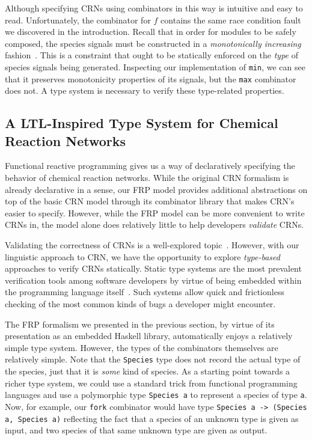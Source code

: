 Although specifying CRNs using combinators in this way is intuitive and easy to read. Unfortunately, the combinator for \( f \) contains the same race condition fault we discovered in the introduction.
Recall that in order for modules to be safely composed, the species signals must be constructed in a \emph{monotonically increasing} fashion~\cite{jCKRS18,doty19}.
This is a constraint that ought to be statically enforced on the \emph{type} of species signals being generated.
Inspecting our implementation of \lstinline!min!, we can see that it preserves monotonicity properties of its signals, but the \lstinline!max! combinator does not.
A type system is necessary to verify these type-related properties.


\subsection{A LTL-Inspired Type System for Chemical Reaction Networks}

Functional reactive programming gives us a way of declaratively specifying the behavior of chemical reaction networks.
While the original CRN formalism is already declarative in a sense, our FRP model provides additional abstractions on top of the basic CRN model through its combinator library that makes CRN's easier to specify.
However, while the FRP model can be more convenient to write CRNs in, the model alone does relatively little to help developers \emph{validate} CRNs.

Validating the correctness of CRNs is a well-explored topic~\cite{oDong12,cDLLMPS12,jKwiTha14,cEHKLLL14,jEKLLLM17}.
However, with our linguistic approach to CRN, we have the opportunity to explore \emph{type-based} approaches to verify CRNs statically.
Static type systems are the most prevalent verification tools among software developers by virtue of being embedded within the programming language itself~\cite{pierce-tapl-2002, Pierce:SF2}.
Such systems allow quick and frictionless checking of the most common kinds of bugs a developer might encounter.

The FRP formalism we presented in the previous section, by virtue of its presentation as an embedded Haskell library, automatically enjoys a relatively simple type system.
However, the types of the combinators themselves are relatively simple.
Note that the \lstinline!Species! type does not record the actual type of the species, just that it is \emph{some} kind of species.
As a starting point towards a richer type system, we could use a standard trick from functional programming languages and use a polymorphic type \lstinline!Species a! to represent a species of type \lstinline!a!.
Now, for example, our \lstinline!fork! combinator would have type \lstinline!Species a -> (Species a, Species a)! reflecting the fact that a species of an unknown type is given as input, and two species of that same unknown type are given as output.

